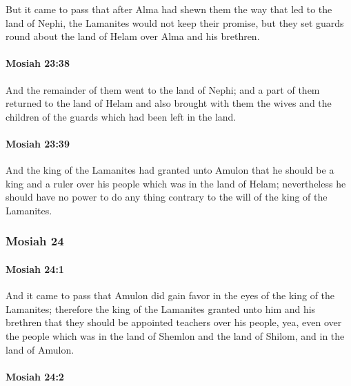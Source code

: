 			But it came to pass that
			after Alma had shewn them the way that led to the land of Nephi,
			the Lamanites would not keep their promise,
			but they set guards round about the land of Helam over Alma and his brethren.

		\paragraph{Mosiah 23:38} %
			\label{MOSIAH-23-38}

			And the remainder of them went to the land of Nephi;
			and a part of them returned to the land of Helam
			and also brought with them the wives and the children of the guards
			which had been left in the land.

		\paragraph{Mosiah 23:39} %
			\label{MOSIAH-23-39}

			And the king of the Lamanites had granted unto Amulon
			that he should be a king and a ruler over his people
			which was in the land of Helam;
			nevertheless he should have no power to do any thing
			contrary to the will of the king of the Lamanites.

	\subsubsection{Mosiah 24} %
		\label{MOSIAH-24}
		
		\paragraph{Mosiah 24:1} %
			\label{MOSIAH-24-1}

			And it came to pass that Amulon did gain favor
			in the eyes of the king of the Lamanites;
			therefore the king of the Lamanites granted unto him and his brethren
			that they should be appointed teachers over his people,
			yea, even over the people
			which was in the land of Shemlon and the land of Shilom,
			and in the land of Amulon.

		\paragraph{Mosiah 24:2} %
			\label{MOSIAH-24-2}

